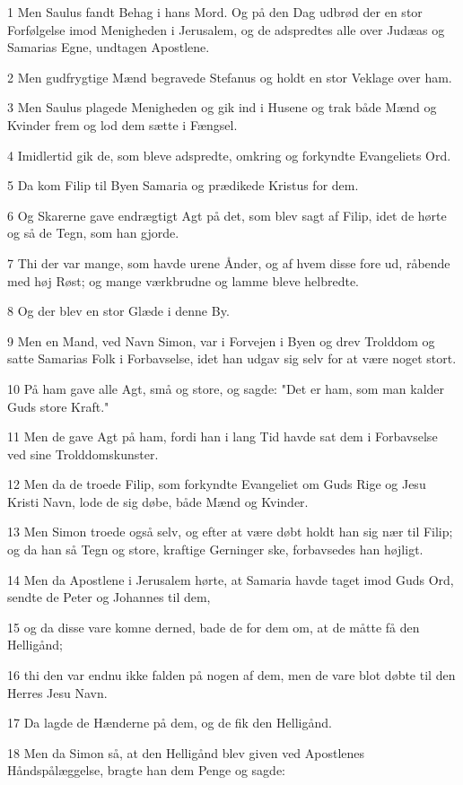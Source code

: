 \par 1 Men Saulus fandt Behag i hans Mord. Og på den Dag udbrød der en stor Forfølgelse imod Menigheden i Jerusalem, og de adspredtes alle over Judæas og Samarias Egne, undtagen Apostlene.
\par 2 Men gudfrygtige Mænd begravede Stefanus og holdt en stor Veklage over ham.
\par 3 Men Saulus plagede Menigheden og gik ind i Husene og trak både Mænd og Kvinder frem og lod dem sætte i Fængsel.
\par 4 Imidlertid gik de, som bleve adspredte, omkring og forkyndte Evangeliets Ord.
\par 5 Da kom Filip til Byen Samaria og prædikede Kristus for dem.
\par 6 Og Skarerne gave endrægtigt Agt på det, som blev sagt af Filip, idet de hørte og så de Tegn, som han gjorde.
\par 7 Thi der var mange, som havde urene Ånder, og af hvem disse fore ud, råbende med høj Røst; og mange værkbrudne og lamme bleve helbredte.
\par 8 Og der blev en stor Glæde i denne By.
\par 9 Men en Mand, ved Navn Simon, var i Forvejen i Byen og drev Trolddom og satte Samarias Folk i Forbavselse, idet han udgav sig selv for at være noget stort.
\par 10 På ham gave alle Agt, små og store, og sagde: "Det er ham, som man kalder Guds store Kraft."
\par 11 Men de gave Agt på ham, fordi han i lang Tid havde sat dem i Forbavselse ved sine Trolddomskunster.
\par 12 Men da de troede Filip, som forkyndte Evangeliet om Guds Rige og Jesu Kristi Navn, lode de sig døbe, både Mænd og Kvinder.
\par 13 Men Simon troede også selv, og efter at være døbt holdt han sig nær til Filip; og da han så Tegn og store, kraftige Gerninger ske, forbavsedes han højligt.
\par 14 Men da Apostlene i Jerusalem hørte, at Samaria havde taget imod Guds Ord, sendte de Peter og Johannes til dem,
\par 15 og da disse vare komne derned, bade de for dem om, at de måtte få den Helligånd;
\par 16 thi den var endnu ikke falden på nogen af dem, men de vare blot døbte til den Herres Jesu Navn.
\par 17 Da lagde de Hænderne på dem, og de fik den Helligånd.
\par 18 Men da Simon så, at den Helligånd blev given ved Apostlenes Håndspålæggelse, bragte han dem Penge og sagde:

